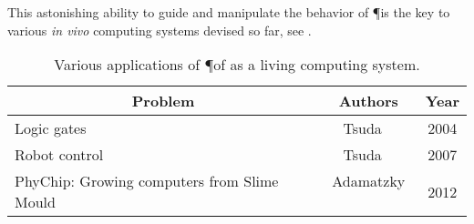 			This astonishing ability to guide and manipulate the behavior of \P is the key to various \textit{in vivo} computing systems devised so far, see .

			\begin{table}
				\centering
				\begin{tabular}{@{} l *2c @{}}
				\toprule
				 \multicolumn{1}{c}{Problem}    & Authors  & Year   \\ 
				\midrule

				Logic gates & Tsuda \etal~\cite{tsuda2004robust} & 2004 \\ 
				Robot control & Tsuda \etal~\cite{Tsuda2007215} & 2007 \\ 
				PhyChip: Growing computers from Slime Mould & Adamatzky \etal~\cite{adamatzky2012physarum} & 2012 \\ 
				
				\bottomrule
				\end{tabular}
				\caption[Computing with live \P]{Various applications of \P of as a living computing system.}
				\label{tab:list_invivo}
			\end{table}

			\FloatBarrier



